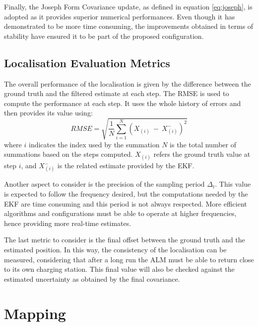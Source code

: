 Finally, the Joseph Form Covariance update, as defined in equation \eqref{eq:joseph}, is adopted as it provides superior numerical performances.
Even though it has demonstrated to be more time consuming, the improvements obtained in terms of stability have ensured it to be part of the proposed configuration.

\subsection{Localisation Evaluation Metrics}

\noindent %
The overall performance of the localisation is given by the difference between the ground truth and the filtered estimate at each step.
The \gls{RMSE} is used to compute the performance at each step.
It uses the whole history of errors and then provides its value using:%
\begin{equation}
\label{eq:rmse}
    RMSE = \sqrt{ \frac{1}{N}\sum_{i=1}^{N} (X_{(i)}~-~X_{(i)}^-)^2}
\end{equation}
where  $i$ indicates the index used by the summation $N$ is the total number of summations based on the steps computed.
$X_{(i)}$ refers the ground truth value at step $i$, and $X_{(i)}^-$ is the related estimate provided by the \gls{EKF}.

Another aspect to consider is the precision of the sampling period $\Delta_t$.
This value is expected to follow the frequency desired, but the computations needed by the \gls{EKF} are time consuming and this period is not always respected.
More efficient algorithms and configurations must be able to operate at higher frequencies, hence providing more real-time estimates.

The last metric to consider is the final offset between the ground truth and the estimated position.
In this way, the consistency of the localisation can be measured, considering that after a long run the \gls{ALM} must be able to return close to its own charging station.
This final value will also be checked against the estimated uncertainty as obtained by the final covariance.%



\section{Mapping}
\label{sec:mapConf}

